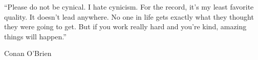 \documentclass[
11pt, %
english, %
singlespacing, %
headsepline, %
oneside,]{BachelorMasterThesis} %
\begin{document}
\cleardoublepage


\vspace*{0.2\textheight}

\noindent\enquote{Please do not be cynical. I hate cynicism. For the record, it's my least favorite quality. It doesn't lead anywhere. No one in life gets exactly what they thought they were going to get. But if you work really hard and you're kind, amazing things will happen.}\bigbreak

\hfill Conan O'Brien

\end{document}
